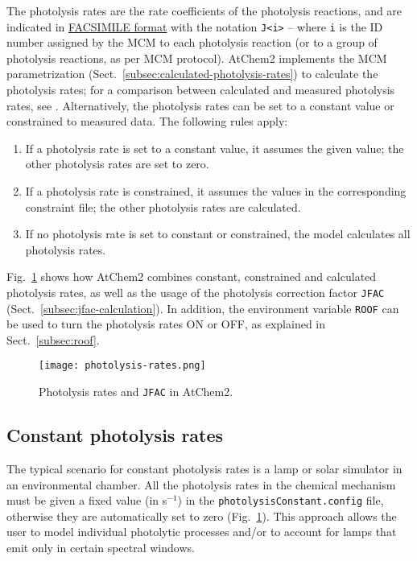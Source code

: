 The photolysis rates are the rate coefficients of the photolysis reactions,
and are indicated in \hyperref[subsec:facsimile-format]{FACSIMILE format}
with the notation \texttt{J<i>} -- where \texttt{i} is the ID number
assigned by the MCM to each photolysis reaction (or to a group of
photolysis reactions, as per MCM protocol). AtChem2 implements the MCM
parametrization (Sect.~\ref{subsec:calculated-photolysis-rates}) to
calculate the photolysis rates; for a comparison between calculated
and measured photolysis rates, see \citet{sommariva_2020}.
Alternatively, the photolysis rates can be set to a constant value or
constrained to measured data. The following rules apply:

\begin{enumerate}
\item If a photolysis rate is set to a constant value, it assumes the
  given value; the other photolysis rates are set to zero.
\item If a photolysis rate is constrained, it assumes the values in
  the corresponding constraint file; the other photolysis rates are
  calculated.
\item If no photolysis rate is set to constant or constrained, the
  model calculates all photolysis rates.
\end{enumerate}

Fig.~\ref{fig:photol} shows how AtChem2 combines constant, constrained
and calculated photolysis rates, as well as the usage of the photolysis
correction factor \texttt{JFAC} (Sect.~\ref{subsec:jfac-calculation}).
In addition, the environment variable \texttt{ROOF} can be used to turn
the photolysis rates ON or OFF, as explained in Sect.~\ref{subsec:roof}.

\begin{figure}[htb]
  \centering
  \texttt{[image: photolysis-rates.png]}
  \caption{Photolysis rates and \texttt{JFAC} in AtChem2.}
  \label{fig:photol}
\end{figure}

\subsection{Constant photolysis rates} \label{subsec:constant-photolysis-rates}

The typical scenario for constant photolysis rates is a lamp or solar
simulator in an environmental chamber. All the photolysis rates in the
chemical mechanism must be given a fixed value (in s$^{-1}$) in the
\texttt{photolysisConstant.config} file, otherwise they are
automatically set to zero (Fig.~\ref{fig:photol}). This approach
allows the user to model individual photolytic processes and/or to
account for lamps that emit only in certain spectral windows.

